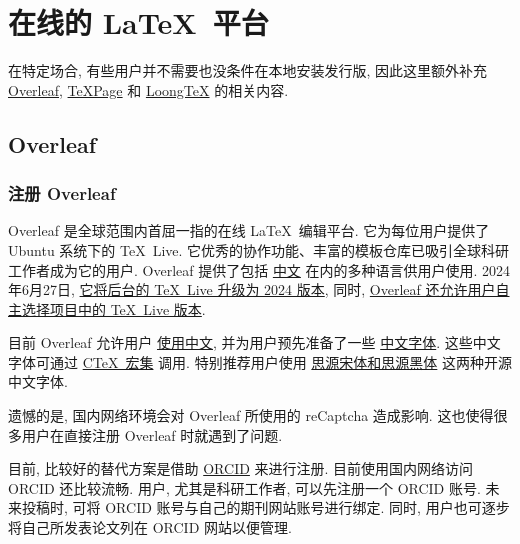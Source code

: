 
\chapter{在线的 \LaTeX\ 平台}

在特定场合,
有些用户并不需要也没条件在本地安装发行版,
因此这里额外补充 \href{www.overleaf.com/}{Overleaf},
\href{https://www.texpage.com/}{TeXPage} 和
\href{https://www.loongtex.com/}{LoongTeX} 的相关内容.

\section{Overleaf}

\subsection{注册 Overleaf}

Overleaf 是全球范围内首屈一指的在线 \LaTeX\ 编辑平台.
它为每位用户提供了 Ubuntu 系统下的 \TeX~Live.
它优秀的协作功能、丰富的模板仓库已吸引全球科研工作者成为它的用户.
Overleaf 提供了包括%
\href{https://cn.overleaf.com/}{中文}%
在内的多种语言供用户使用.
2024年6月27日,
\href{https://www.overleaf.com/blog/tex-live-2024-is-now-available}{它将后台的 \TeX~Live 升级为 2024 版本},
同时,
\href{https://www.overleaf.com/blog/new-feature-select-your-tex-live-compiler-version}{Overleaf 还允许用户自主选择项目中的 \TeX~Live 版本}.

目前 Overleaf 允许用户%
\href{https://www.overleaf.com/learn/latex/Chinese}{使用中文},
并为用户预先准备了一些%
\href{https://www.overleaf.com/learn/latex/Questions/Which_OTF_or_TTF_fonts_are_supported_via_fontspec%3F#Fonts_for_CJK}{中文字体}.
这些中文字体可通过%
\href{https://www.overleaf.com/latex/templates/using-the-ctex-package-on-overleaf-zai-overleafping-tai-shang-shi-yong-ctex/gndvpvsmjcqx}{C\TeX\ 宏集}%
调用.
特别推荐用户使用%
\href{https://www.overleaf.com/latex/examples/demonstration-of-noto-serif-cjk-and-noto-sans-cjk-fonts/sgrwgcddtqsq}{思源宋体和思源黑体}%
这两种开源中文字体.

遗憾的是,
国内网络环境会对 Overleaf 所使用的 reCaptcha 造成影响.
这也使得很多用户在直接注册 Overleaf 时就遇到了问题.

目前,
比较好的替代方案是借助 \href{https://orcid.org/}{ORCID} 来进行注册.
目前使用国内网络访问 ORCID 还比较流畅.
用户, 尤其是科研工作者, 可以先注册一个 ORCID 账号.
未来投稿时,
可将 ORCID 账号与自己的期刊网站账号进行绑定.
同时,
用户也可逐步将自己所发表论文列在 ORCID 网站以便管理.

